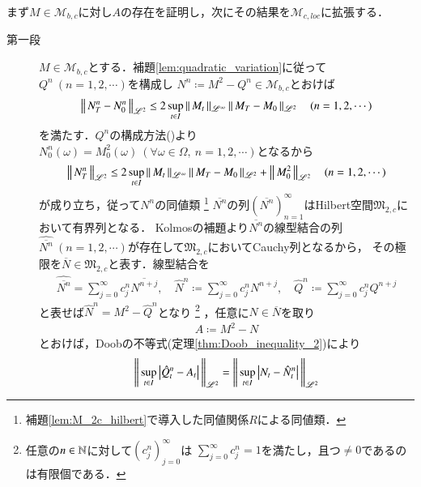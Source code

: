 	\begin{prf}
		まず$M \in \mathcal{M}_{b,c}$に対し$A$の存在を証明し，次にその結果を$\mathcal{M}_{c,loc}$に拡張する．
		\begin{description}
			\item[第一段]
				$M \in \mathcal{M}_{b,c}$とする．補題\ref{lem:quadratic_variation}に従って$Q^n\ (n=1,2,\cdots)$を構成し
				$N^n \coloneqq M^2 - Q^n \in \mathcal{M}_{b,c}$とおけば
				\begin{align}
					\left\|\, N_T^n - N_0^n\, \right\|_{\mathscr{L}^2} \leq 2 \operatorname*{sup}_{t \in I} \left\|\, M_t\, \right\|_{\mathscr{L}^\infty} \left\|\, M_T - M_0\, \right\|_{\mathscr{L}^2} \quad (n=1,2,\cdots)
				\end{align}
				を満たす．$Q^n$の構成方法()より$N_0^n(\omega) = M^2_0(\omega)\ (\forall \omega \in \Omega,\ n=1,2,\cdots)$となるから
				\begin{align}
					\left\|\, N_T^n\, \right\|_{\mathscr{L}^2} 
					\leq 2 \operatorname*{sup}_{t \in I} \left\|\, M_t\, \right\|_{\mathscr{L}^\infty} \left\|\, M_T - M_0\, \right\|_{\mathscr{L}^2} + \left\|\, M^2_0\, \right\|_{\mathscr{L}^2} \quad (n=1,2,\cdots)
				\end{align}
				が成り立ち，従って$N^n$の同値類
				\footnote{
					補題\ref{lem:M_2c_hilbert}で導入した同値関係$R$による同値類．
				}
				$\overline{N^n}$の列$(\overline{N^n})_{n=1}^{\infty}$はHilbert空間$\mathfrak{M}_{2,c}$において有界列となる．
				Kolmosの補題より$\overline{N^n}$の線型結合の列$\hat{\overline{N^n}}\ (n=1,2,\cdots)$が存在して$\mathfrak{M}_{2,c}$においてCauchy列となるから，
				その極限を$\overline{N} \in \mathfrak{M}_{2,c}$と表す．線型結合を
				\begin{align}
					\hat{\overline{N^n}} = \sum_{j=0}^{\infty} c^n_j \overline{N^{n+j}}, \quad
					\hat{N}^n \coloneqq \sum_{j=0}^{\infty} c^n_j N^{n+j}, \quad
					\hat{Q}^n \coloneqq \sum_{j=0}^{\infty} c^n_j Q^{n+j}
				\end{align}
				と表せば$\hat{N}^n = M^2 - \hat{Q}^n$となり
				\footnote{
					任意の$n \in \mathbb{N}$に対して$(c^n_j)_{j=0}^{\infty}$は
					$\sum_{j=0}^{\infty} c^n_j = 1$を満たし，且つ$\neq 0$であるのは有限個である．
				}
				，任意に$N \in \overline{N}$を取り
				\begin{align}
					A \coloneqq M^2 - N \label{eq:thm_quadratic_variation_0}
				\end{align}
				とおけば，Doobの不等式(定理\ref{thm:Doob_inequality_2})により
				\begin{align}
					\Norm{\sup{t \in I}{\left| \hat{Q}_t^n - A_t \right|}}{\mathscr{L}^2}
					&= \Norm{\sup{t \in I}{\left| N_t - \hat{N}_t^n \right|}}{\mathscr{L}^2} \\

\end{align}
\end{description}
\end{prf}
